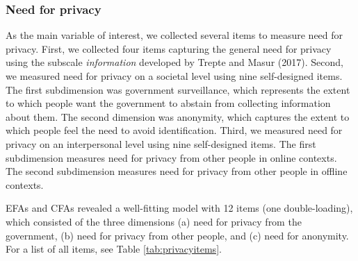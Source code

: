 \documentclass[man,floatsintext]{apa6}
\begin{document}
\hypertarget{need-for-privacy}{%
\subsubsection{Need for privacy}\label{need-for-privacy}}

As the main variable of interest, we collected several items to measure need for privacy. First, we collected four items capturing the general need for privacy using the subscale \emph{information} developed by Trepte and Masur (2017). Second, we measured need for privacy on a societal level using nine self-designed items. The first subdimension was government surveillance, which represents the extent to which people want the government to abstain from collecting information about them. The second dimension was anonymity, which captures the extent to which people feel the need to avoid identification. Third, we measured need for privacy on an interpersonal level using nine self-designed items. The first subdimension measures need for privacy from other people in online contexts. The second subdimension measures need for privacy from other people in offline contexts.

EFAs and CFAs revealed a well-fitting model with 12 items (one double-loading), which consisted of the three dimensions (a) need for privacy from the government, (b) need for privacy from other people, and (c) need for anonymity. For a list of all items, see Table \ref{tab:privacyitems}.
\end{document}

